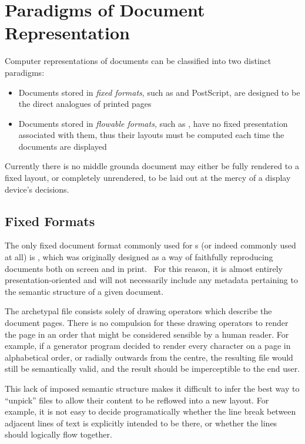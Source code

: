 \section{Paradigms of Document Representation}
Computer representations of documents can be classified into two distinct paradigms:
\begin{itemize}
 \item Documents stored in \emph{fixed formats}, such as \pdf{} and PostScript, are designed to be the direct analogues of printed pages
 \item Documents stored in \emph{flowable formats}, such as \html{}, have no fixed presentation associated with them, thus their layouts must be computed each time the documents are displayed
\end{itemize}
Currently there is no middle ground\ed a document may either be fully rendered to a fixed layout, or completely unrendered, to be laid out at the mercy of a display device's decisions.

\subsection{Fixed Formats}
\label{sec:fixedformats}
The only fixed document format commonly used for \ebook{}s (or indeed commonly used at all) is \pdf{}, which was originally designed as a way of faithfully reproducing documents both on screen and in print.~\cite{Warnock1991} For this reason, it is almost entirely pre\-s\-en\-ta\-tion-oriented and will not necessarily include any metadata pertaining to the semantic structure of a given document.

The archetypal \pdf{} file consists solely of drawing operators which describe the document pages. There is no compulsion for these drawing operators to render the page in an order that might be considered sensible by a human reader. For example, if a \pdf{} generator program decided to render every character on a page in alphabetical order, or radially outwards from the centre, the resulting file would still be semantically valid, and the result should be imperceptible to the end user.

This lack of imposed semantic structure makes it difficult to infer the best way to ``unpick'' \pdf{} files to allow their content to be reflowed into a new layout. For example, it is not easy to decide programatically whether the line break between adjacent lines of text is explicitly intended to be there, or whether the lines should logically flow together.

